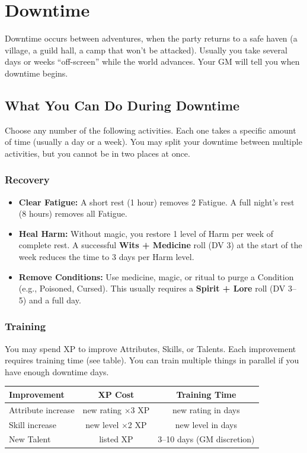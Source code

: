 \chapter{Downtime}
\label{ch:downtime}

\begin{tcolorbox}[colback=blue!5!white,colframe=blue!75!black,title=When Does Downtime Happen?,breakable]
Downtime occurs between adventures, when the party returns to a safe haven (a village, a guild hall, a camp that won't be attacked). Usually you take several days or weeks ``off-screen'' while the world advances. Your GM will tell you when downtime begins.
\end{tcolorbox}

\section{What You Can Do During Downtime}
Choose any number of the following activities. Each one takes a specific amount of time (usually a day or a week). You may split your downtime between multiple activities, but you cannot be in two places at once.

\subsection{Recovery}
\begin{itemize}
  \item \textbf{Clear Fatigue:} A short rest (1 hour) removes 2 Fatigue. A full night's rest (8 hours) removes all Fatigue.
  \item \textbf{Heal Harm:} Without magic, you restore 1 level of Harm per week of complete rest. A successful \textbf{Wits + Medicine} roll (DV 3) at the start of the week reduces the time to 3 days per Harm level.
  \item \textbf{Remove Conditions:} Use medicine, magic, or ritual to purge a Condition (e.g., Poisoned, Cursed). This usually requires a \textbf{Spirit + Lore} roll (DV 3--5) and a full day.
\end{itemize}

\subsection{Training}
You may spend XP to improve Attributes, Skills, or Talents. Each improvement requires training time (see table). You can train multiple things in parallel if you have enough downtime days.

\begin{center}
\begin{tabular}{lcc}
\toprule
\textbf{Improvement} & \textbf{XP Cost} & \textbf{Training Time} \\
\midrule
Attribute increase & new rating \(\times\)3 XP & new rating in days \\
Skill increase & new level \(\times\)2 XP & new level in days \\
New Talent & listed XP & 3--10 days (GM discretion) \\
\bottomrule
\end{tabular}
\end{center}

